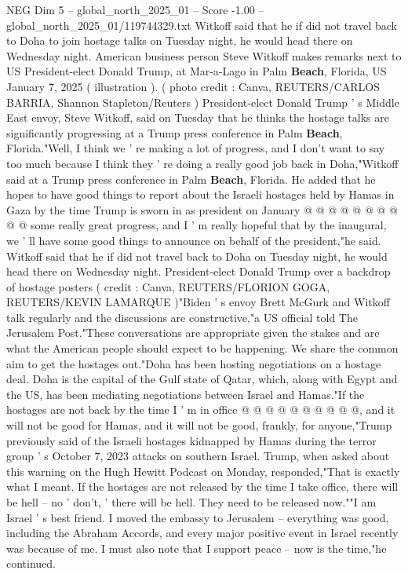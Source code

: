 \begin{textsample}{NEG Dim 5 – global\_north\_2025\_01 – Score -1.00 – global\_north\_2025\_01/119744329.txt}  \label{ex:f5_neg_070}
Witkoff said that he if did not travel back to Doha to join hostage talks on Tuesday night, he would head there on Wednesday night.
American business person Steve Witkoff makes remarks next to US President-elect Donald Trump, at Mar-a-Lago in Palm \textbf{Beach}, Florida, US January 7, 2025 ( illustration ). ( photo credit : Canva, REUTERS/CARLOS BARRIA, Shannon Stapleton/Reuters ) President-elect Donald Trump ' s Middle East envoy, Steve Witkoff, said on Tuesday that he thinks the hostage talks are significantly progressing at a Trump press conference in Palm \textbf{Beach}, Florida."Well, I think we ' re making a lot of progress, and I don't want to say too much because I think they ' re doing a really good job back in Doha,"Witkoff said at a Trump press conference in Palm \textbf{Beach}, Florida.
He added that he hopes to have good things to report about the Israeli hostages held by Hamas in Gaza by the time Trump is sworn in as president on January @ @ @ @ @ @ @ @ @ @ some really great progress, and I ' m really hopeful that by the inaugural, we ' ll have some good things to announce on behalf of the president,"he said.
Witkoff said that he if did not travel back to Doha on Tuesday night, he would head there on Wednesday night.
President-elect Donald Trump over a backdrop of hostage posters ( credit : Canva, REUTERS/FLORION GOGA, REUTERS/KEVIN LAMARQUE )"Biden ' s envoy Brett McGurk and Witkoff talk regularly and the discussions are constructive,"a US official told The Jerusalem Post."These conversations are appropriate given the stakes and are what the American people should expect to be happening.
We share the common aim to get the hostages out."Doha has been hosting negotiations on a hostage deal.
Doha is the capital of the Gulf state of Qatar, which, along with Egypt and the US, has been mediating negotiations between Israel and Hamas."If the hostages are not back by the time I ' m in office @ @ @ @ @ @ @ @ @ @, and it will not be good for Hamas, and it will not be good, frankly, for anyone,"Trump previously said of the Israeli hostages kidnapped by Hamas during the terror group ' s October 7, 2023 attacks on southern Israel.
Trump, when asked about this warning on the Hugh Hewitt Podcast on Monday, responded,"That is exactly what I meant.
If the hostages are not released by the time I take office, there will be hell -- no ' don't, ' there will be hell.
They need to be released now.""I am Israel ' s best friend.
I moved the embassy to Jerusalem -- everything was good, including the Abraham Accords, and every major positive event in Israel recently was because of me.
I must also note that I support peace -- now is the time,"he continued.

\end{textsample}
